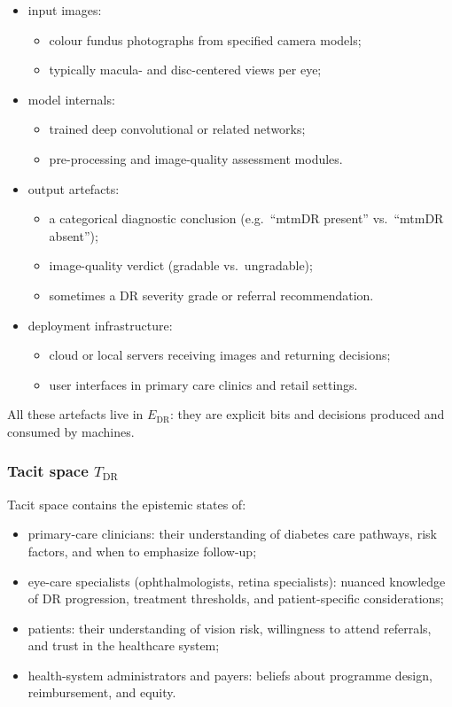 \begin{itemize}
  \item input images:
        \begin{itemize}
          \item colour fundus photographs from specified camera models;
          \item typically macula- and disc-centered views per eye;
        \end{itemize}
  \item model internals:
        \begin{itemize}
          \item trained deep convolutional or related networks;
          \item pre-processing and image-quality assessment modules.
        \end{itemize}
  \item output artefacts:
        \begin{itemize}
          \item a categorical diagnostic conclusion (e.g.\ ``mtmDR
                present'' vs.\ ``mtmDR absent'');
          \item image-quality verdict (gradable vs.\ ungradable);
          \item sometimes a DR severity grade or referral recommendation.
        \end{itemize}
  \item deployment infrastructure:
        \begin{itemize}
          \item cloud or local servers receiving images and returning
                decisions;
          \item user interfaces in primary care clinics and retail
                settings.
        \end{itemize}
\end{itemize}

All these artefacts live in \(E_{\mathrm{DR}}\): they are explicit bits and
decisions produced and consumed by machines.

\subsubsection*{Tacit space \(T_{\mathrm{DR}}\)}

Tacit space contains the epistemic states of:

\begin{itemize}
  \item primary-care clinicians:
        their understanding of diabetes care pathways, risk factors, and
        when to emphasize follow-up;
  \item eye-care specialists (ophthalmologists, retina specialists):
        nuanced knowledge of DR progression, treatment thresholds, and
        patient-specific considerations;
  \item patients:
        their understanding of vision risk, willingness to attend
        referrals, and trust in the healthcare system;
  \item health-system administrators and payers:
        beliefs about programme design, reimbursement, and equity.
\end{itemize}

